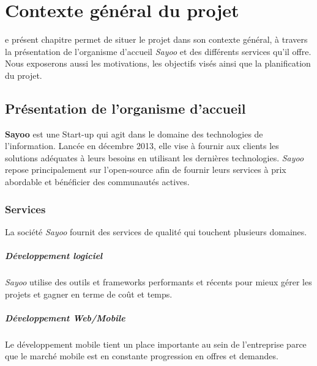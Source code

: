 \chapter{Contexte général du projet}
\begin{onehalfspace}

e présent chapitre permet de situer le projet dans son contexte général, à travers la présentation de l'organisme d'accueil \emph{Sayoo} et des différents services qu'il offre. Nous exposerons aussi les motivations, les objectifs visés ainsi que la planification du projet.

\newpage


\section{Présentation de l'organisme d'accueil}

\textbf{Sayoo} est une Start-up qui agit dans le domaine des technologies de l'information. Lancée en décembre 2013, elle vise à fournir aux clients les solutions adéquates à leurs besoins en utilisant les dernières technologies. \emph{Sayoo} repose principalement sur l'open-source afin de fournir leurs services à prix abordable et bénéficier des communautés actives. 



\subsection{Services}
La société \emph{Sayoo} fournit des services de qualité qui touchent plusieurs domaines.
\paragraph*{Développement logiciel}
\emph{Sayoo} utilise des outils et frameworks performants et récents pour mieux gérer les projets et gagner en terme de coût et temps.

\paragraph*{Développement Web/Mobile}
Le développement mobile tient un place importante au sein de l'entreprise parce que le marché mobile est en constante progression en offres et demandes. 


\end{onehalfspace}
